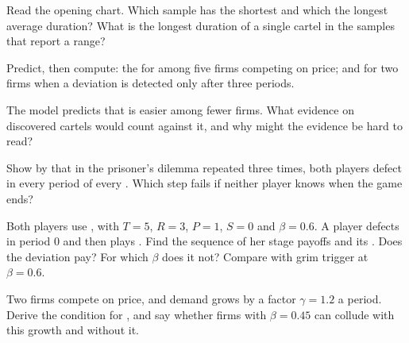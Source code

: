 \begin{exercise}[$\star$]\label{exo:b2:repeated-games:2}
Read the opening chart. Which sample has the shortest and which the longest average duration? What is the longest
duration of a single cartel in the samples that report a range?
\end{exercise}

\begin{exercise}[$\star$]\label{exo:b2:repeated-games:3}
Predict, then compute: the  for  among five firms competing on price; and for
two firms when a deviation is detected only after three periods.
\end{exercise}

\begin{exercise}[$\star$]\label{exo:b2:repeated-games:4}
The model predicts that  is easier among fewer firms. What evidence on discovered cartels would count
against it, and why might the evidence be hard to read?
\end{exercise}

\begin{exercise}[$\star\star$]\label{exo:b2:repeated-games:5}
Show by  that in the prisoner's dilemma repeated three times, both players defect in every period
of every . Which step fails if neither player knows when the game ends?
\end{exercise}

\begin{exercise}[$\star\star$]\label{exo:b2:repeated-games:6}
Both players use , with $T = 5$, $R = 3$, $P = 1$, $S = 0$ and $\beta = 0.6$. A player defects in period 0 and then
plays . Find the sequence of her stage payoffs and its . Does the deviation pay?
For which $\beta$ does it not? Compare with grim trigger at $\beta = 0.6$.
\end{exercise}

\begin{exercise}[$\star\star$]\label{exo:b2:repeated-games:7}
Two firms compete on price, and demand grows by a factor $\gamma = 1.2$ a period. Derive the condition for ,
and say whether firms with $\beta = 0.45$ can collude with this growth and without it.
\end{exercise}

